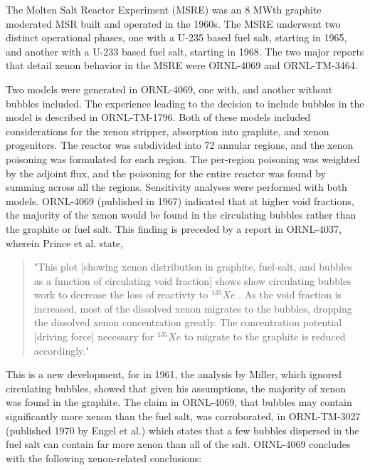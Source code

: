 The Molten Salt Reactor Experiment (MSRE) was an 8 MWth graphite moderated MSR built and operated in the 1960s.\cite[p. 376]{MacPherson1985}  The MSRE underwent two distinct operational phases, one with a U-235 based fuel salt, starting in 1965, and another with a U-233 based fuel salt, starting in 1968.\cite[p. 6]{Forsberg2006} The two major reports that detail xenon behavior in the MSRE were ORNL-4069 and ORNL-TM-3464.\cite{ORNL4069,ORNLTM3464}

Two models were generated in ORNL-4069, one with, and another without bubbles included. The experience leading to the decision to include bubbles in the model is described in ORNL-TM-1796. \cite[p. 14]{ORNLTM1796} Both of these models included considerations for the xenon stripper,  absorption into graphite, and xenon progenitors.  The reactor was subdivided into 72 annular regions, and the xenon poisoning was formulated for each region.  The per-region poisoning was weighted by the adjoint flux, and the poisoning for the entire reactor was found by summing across all the regions.  Sensitivity analyses were performed with both models. ORNL-4069 (published in 1967) indicated that at higher void fractions, the majority of the xenon would be found in the circulating bubbles rather than the graphite or fuel salt. \cite[p. 56]{ORNL4069} This finding is preceded by a report in ORNL-4037, wherein Prince et al. state,

\begin{quote}
"This plot [showing xenon distribution in graphite, fuel-salt, and bubbles as a function of circulating void fraction] shows show circulating bubbles work to decrease the loss of reactivty to $^{135}Xe$ .  As the void fraction is increased, most of the dissolved xenon migrates to the bubbles, dropping the dissolved xenon concentration greatly. The concentration potential [driving force] necessary for $^{135}Xe$  to migrate to the graphite is reduced accordingly." \cite[p. 15]{ORNL4037}
\end{quote}

This is a new development, for in 1961, the analysis by Miller, which ignored circulating bubbles, showed that given his assumptions, the majority of xenon was found in the graphite. \cite[p. 7]{Miller1961} The claim in ORNL-4069, that bubbles may contain significantly more xenon than the fuel salt, was corroborated, in ORNL-TM-3027 (published 1970 by Engel et al.) which states that a few bubbles dispersed in the fuel salt can contain far more xenon than all of the salt.\cite[p. 47]{ORNLTM3027} ORNL-4069 concludes with the following xenon-related conclusions\cite[p. 58]{ORNL4069}:

